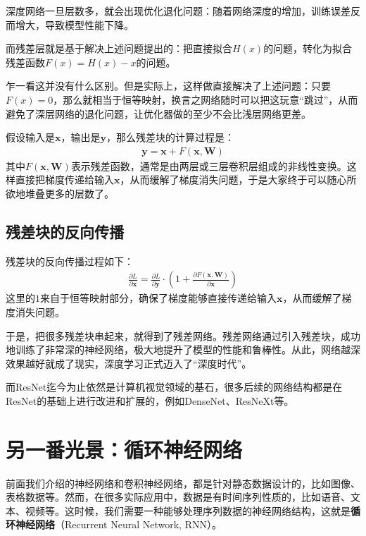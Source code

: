 深度网络一旦层数多，就会出现优化退化问题：随着网络深度的增加，训练误差反而增大，导致模型性能下降。

而残差层就是基于解决上述问题提出的：把直接拟合$H(x)$的问题，转化为拟合残差函数$F(x) = H(x) - x$的问题。

乍一看这并没有什么区别。但是实际上，这样做直接解决了上述问题：只要$F(x)=0$，那么就相当于恒等映射，换言之网络随时可以把这玩意“跳过”，从而避免了深层网络的退化问题，让优化器做的至少不会比浅层网络更差。

假设输入是$\mathbf{x}$，输出是$\mathbf{y}$，那么残差块的计算过程是：
\begin{align*}
\mathbf{y} = \mathbf{x} + F(\mathbf{x}, \mathbf{W})
\end{align*}
其中$F(\mathbf{x}, \mathbf{W})$表示残差函数，通常是由两层或三层卷积层组成的非线性变换。这样直接把梯度传递给输入$\mathbf{x}$，从而缓解了梯度消失问题，于是大家终于可以随心所欲地堆叠更多的层数了。

\subsection{残差块的反向传播}

残差块的反向传播过程如下：
\begin{align*}
\frac{\partial L}{\partial \mathbf{x}} = \frac{\partial L}{\partial \mathbf{y}} \cdot \left(1 + \frac{\partial F(\mathbf{x}, \mathbf{W})}{\partial \mathbf{x}}\right)
\end{align*}
这里的$1$来自于恒等映射部分，确保了梯度能够直接传递给输入$\mathbf{x}$，从而缓解了梯度消失问题。

于是，把很多残差块串起来，就得到了残差网络。残差网络通过引入残差块，成功地训练了非常深的神经网络，极大地提升了模型的性能和鲁棒性。从此，网络越深效果越好就成了现实，深度学习正式迈入了“深度时代”。

而ResNet迄今为止依然是计算机视觉领域的基石，很多后续的网络结构都是在ResNet的基础上进行改进和扩展的，例如DenseNet、ResNeXt等。

\section{另一番光景：循环神经网络}

前面我们介绍的神经网络和卷积神经网络，都是针对静态数据设计的，比如图像、表格数据等。然而，在很多实际应用中，数据是有时间序列性质的，比如语音、文本、视频等。这时候，我们需要一种能够处理序列数据的神经网络结构，这就是\textbf{循环神经网络}（Recurrent Neural Network, RNN）。

